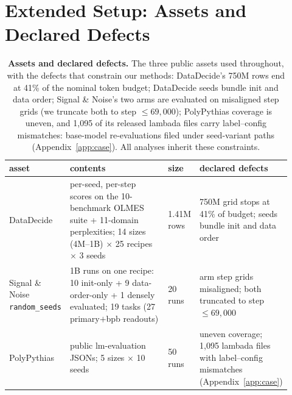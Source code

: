 
\section{Extended Setup: Assets and Declared Defects}
\label{app:setup}

\begin{table}[!htbp]
\centering
\caption{\textbf{Assets and declared defects.} The three public assets used throughout, with the
defects that constrain our methods: DataDecide's 750M rows end at 41\% of the nominal token
budget; DataDecide seeds bundle init and data order; Signal \& Noise's two arms are evaluated on
misaligned step grids (we truncate both to step $\le 69{,}000$); PolyPythias coverage is uneven,
and 1{,}095 of its released lambada files carry label--config mismatches: base-model
re-evaluations filed under seed-variant paths (Appendix~\ref{app:case}). All analyses inherit these constraints.}
\label{tab:assets}
\footnotesize
\setlength{\tabcolsep}{4pt}
\begin{tabular}{@{}p{0.16\linewidth}p{0.36\linewidth}p{0.11\linewidth}p{0.29\linewidth}@{}}
\toprule
asset & contents & size & declared defects \\
\midrule
DataDecide \citep{datadecide2025} &
per-seed, per-step scores on the 10-benchmark OLMES suite + 11-domain perplexities;
14 sizes (4M--1B) $\times$ 25 recipes $\times$ 3 seeds &
1.41M rows &
750M grid stops at 41\% of budget; seeds bundle init and data order \\
Signal \& Noise \texttt{random\_seeds} \citep{signalandnoise2025} &
1B runs on one recipe: 10 init-only + 9 data-order-only + 1 densely evaluated; 19 tasks (27
primary$+$bpb readouts) &
20 runs &
arm step grids misaligned; both truncated to step $\le 69{,}000$ \\
PolyPythias \citep{polypythias2025} &
public lm-evaluation JSONs; 5 sizes $\times$ 10 seeds &
50 runs &
uneven coverage; 1{,}095 lambada files with label--config mismatches (Appendix~\ref{app:case}) \\
\bottomrule
\end{tabular}
\end{table}

